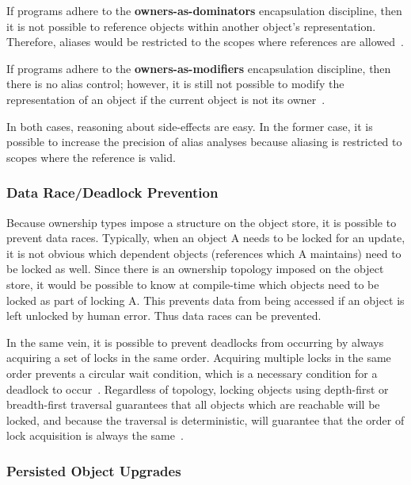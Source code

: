 \documentclass{acm_proc_article-sp}
\begin{document}
If programs adhere to the \textbf{owners-as-dominators} encapsulation
discipline, then it is not possible to reference objects within another
object's representation. Therefore, aliases would be restricted to
the scopes where references are
allowed~\cite{clarke98ownership,boyapati04safejava,cameron07mojo}.

If programs adhere to the \textbf{owners-as-modifiers} encapsulation
discipline, then there is no alias control; however, it is still not possible
to modify the representation of an object if the current object is not its
owner~\cite{cunningham08ut,dietl09gut}.

In both cases, reasoning about side-effects are easy. In the former case, it is
possible to increase the precision of alias analyses because aliasing is
restricted to scopes where the reference is valid.

\subsubsection{Data Race/Deadlock Prevention}
\label{subsubsec:data_race_prevention}

Because ownership types impose a structure on the object store, it is possible
to prevent data races. Typically, when an object A needs to be locked for an
update, it is not obvious which dependent objects (references which A
maintains) need to be locked as well. Since there is an ownership topology
imposed on the object store, it would be possible to know at compile-time which
objects need to be locked as part of locking A. This prevents data from being
accessed if an object is left unlocked by human error. Thus data races can be
prevented.

In the same vein, it is possible to prevent deadlocks from occurring by always
acquiring a set of locks in the same order. Acquiring multiple locks in the same
order prevents a circular wait condition, which is a necessary condition for a
deadlock to occur~\cite{silberschatz08os}. Regardless of topology,
locking objects using depth-first or breadth-first traversal guarantees that
all objects which are reachable will be locked, and because the traversal is
deterministic, will guarantee that the order of lock acquisition is always the
same~\cite{boyapati02races}.

\subsubsection{Persisted Object Upgrades}
\label{subsubsec:object_upgrades}
\end{document}
